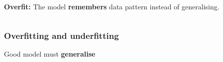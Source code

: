 \documentclass[aspectratio=169]{beamer}
\begin{document}
\begin{frame}
\begin{columns}[t]
			\textbf{Overfit:} The model \textbf{remembers} data pattern instead of generalising.
	\end{columns}
\end{frame}

\begin{frame}
	\frametitle{Overfitting and underfitting}
	\begin{center}
		{\LARGE Good model must \textbf{generalise}}\\
	\end{center}
\end{frame}
\end{document}
